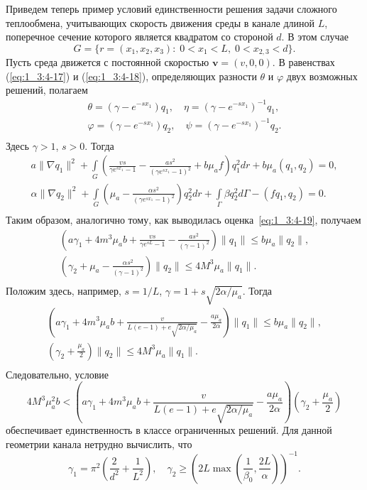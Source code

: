 Приведем теперь пример условий единственности решения задачи
сложного теплообмена, учитывающих скорость движения среды в канале
длиной $L$, поперечное сечение которого является квадратом со
стороной $d$.
В этом случае
\begin{equation}
    \label{eq:1_3:4-21}
    G= \{r=(x_1, x_2, x_3): \; 0 < x_1 < L, \; 0 < x_{2,3} < d \}.
\end{equation}
Пусть среда движется с постоянной скоростью $\textbf{v} = (v, 0,
0)$.
В равенствах (\ref{eq:1_3:4-17}) и (\ref{eq:1_3:4-18}), определяющих
разности $\theta$ и $\varphi$ двух возможных решений, полагаем
\begin{gather*}
    \theta = (\gamma- e^{-sx_1})q_1, \quad \eta = (\gamma-
    e^{-sx_1})^{-1}q_1,\\
    \varphi = (\gamma- e^{-sx_1})q_2, \quad \psi = (\gamma-
    e^{-sx_1})^{-1}q_2.\\
\end{gather*}
Здесь $\gamma > 1$, $s > 0$.
Тогда
\begin{gather*}
    a\|\nabla q_1\|^2 + \int \limits_G \left(\frac{vs}{\gamma
    e^{sx_1}-1} - \frac{as^2}{(\gamma e^{sx_1}-1)^2} + b\mu_a
    f\right)q_1^2 dr + b\mu_a(q_1, q_2)=0,\\
    \alpha\|\nabla q_2\|^2 + \int \limits_G \left(\mu_a - \frac{\alpha
    s^2}{(\gamma e^{sx_1}-1)^2}\right)q_2^2 dr + \int \limits_{\Gamma}
    \beta q_2^2 d\Gamma - (f q_1, q_2)=0.\\
\end{gather*}
Таким образом, аналогично тому, как выводилась оценка~\eqref{eq:1_3:4-19}, получаем
\begin{gather*}
    \left(a\gamma_1+4m^3\mu_a b + \frac{vs}{\gamma e^{sL}-1} -
    \frac{as^2}{(\gamma-1)^2}\right)\|q_1\| \leq b\mu_a\|q_2\|,\\
    \left(\gamma_2+\mu_a - \frac{\alpha
    s^2}{(\gamma-1)^2}\right)\|q_2\| \leq 4M^3\mu_a\|q_1\|.\\
\end{gather*}
Положим здесь, например, $s=1/L$,
$\gamma=1+s\sqrt{2\alpha/\mu_a}$.
Тогда
\begin{gather*}
    \left(a\gamma_1+4m^3\mu_a b +
    \frac{v}{L(e-1)+e\sqrt{2\alpha/\mu_a}} -
    \frac{a\mu_a}{2\alpha}\right)\|q_1\| \leq b\mu_a\|q_2\|,\\
    \left(\gamma_2+ \frac{\mu_a}{2}\right)\|q_2\| \leq
    4M^3\mu_a\|q_1\|.\\
\end{gather*}
Следовательно, условие
\begin{equation}
    \label{eq:1_3:4-22}
    4M^3\mu_a^2 b < \left(a\gamma_1 + 4m^3\mu_a b +
    \frac{v}{L(e-1)+e\sqrt{2\alpha/\mu_a}}-
    \frac{a\mu_a}{2\alpha}\right)\left(\gamma_2+\frac{\mu_a}{2}\right)
\end{equation}
обеспечивает единственность в классе ограниченных решений.
Для
данной геометрии канала нетрудно вычислить, что
\[
    \gamma_1 = \pi^2\left(\frac{2}{d^2} + \frac{1}{L^2}\right), \quad
    \gamma_2 \geq
    \left(2L\max\left(\frac{1}{\beta_0},\frac{2L}{\alpha}\right)\right)^{-1}.
\]



